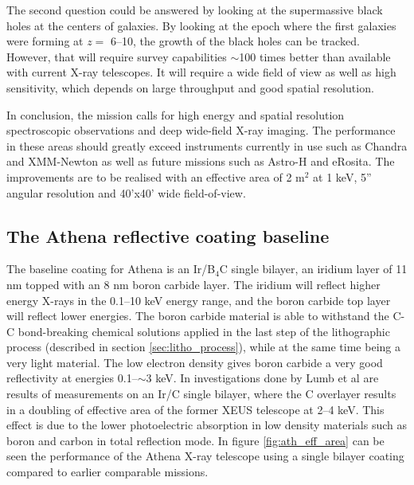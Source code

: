 The second question could be answered by looking at the supermassive black holes at the centers of galaxies. By looking at the epoch where the first galaxies were forming at $z=$ 6--10, the growth of the black holes can be tracked. However, that will require survey capabilities $\sim$100 times better than available with current X-ray telescopes. It will require a wide field of view as well as high sensitivity, which depends on large throughput and good spatial resolution.

In conclusion, the mission calls for high energy and spatial resolution spectroscopic observations and deep wide-field X-ray imaging. The performance in these areas should greatly exceed instruments currently in use such as Chandra and XMM-Newton as well as future missions such as Astro-H and eRosita. The improvements are to be realised with an effective area of 2 m$^2$ at 1 keV, 5'' angular resolution and 40'x40' wide field-of-view\cite{Willingale:2013vo}.

\subsection{The Athena reflective coating baseline}
The baseline coating for Athena is an Ir/B$_4$C single bilayer, an iridium layer of 11 nm topped with an 8 nm boron carbide layer. The iridium will reflect higher energy X-rays in the 0.1--10 keV energy range, and the boron carbide top layer will reflect lower energies. The boron carbide material is able to withstand the C-C bond-breaking chemical solutions applied in the last step of the lithographic process (described in section \ref{sec:litho_process}), while at the same time being a very light material. The low electron density gives boron carbide a very good reflectivity at energies 0.1--$\sim$3 keV. In investigations done by Lumb et al are results of measurements on an Ir/C single bilayer, where the C overlayer results in a doubling of effective area of the former XEUS telescope at 2--4 keV\cite{Lumb:2007vt}. This effect is due to the lower photoelectric absorption in low density materials such as boron and carbon in total reflection mode\cite{pareschi:2004dd}. In figure \ref{fig:ath_eff_area} can be seen the performance of the Athena X-ray telescope using a single bilayer coating compared to earlier comparable missions.


